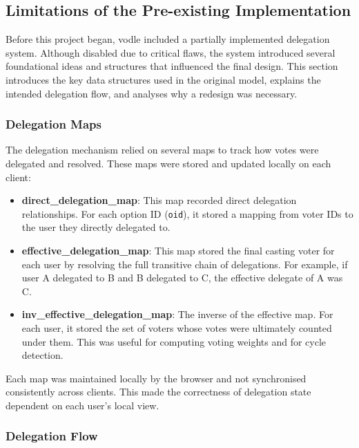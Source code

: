 \subsection{Limitations of the Pre-existing Implementation}

Before this project began, vodle included a partially implemented delegation system. Although disabled due to critical flaws, the system introduced several foundational ideas and structures that influenced the final design. This section introduces the key data structures used in the original model, explains the intended delegation flow, and analyses why a redesign was necessary.

\subsubsection*{Delegation Maps}

The delegation mechanism relied on several maps to track how votes were delegated and resolved. These maps were stored and updated locally on each client:

\begin{itemize}
    \item \textbf{direct\_delegation\_map}: This map recorded direct delegation relationships. For each option ID (\texttt{oid}), it stored a mapping from voter IDs to the user they directly delegated to.

    \item \textbf{effective\_delegation\_map}: This map stored the final casting voter for each user by resolving the full transitive chain of delegations. For example, if user A delegated to B and B delegated to C, the effective delegate of A was C.

    \item \textbf{inv\_effective\_delegation\_map}: The inverse of the effective map. For each user, it stored the set of voters whose votes were ultimately counted under them. This was useful for computing voting weights and for cycle detection.
\end{itemize}

Each map was maintained locally by the browser and not synchronised consistently across clients. This made the correctness of delegation state dependent on each user's local view.

\subsubsection*{Delegation Flow}

